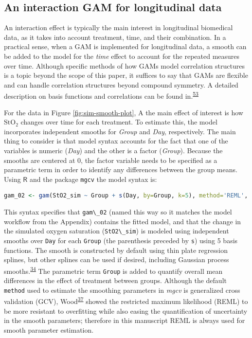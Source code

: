 \documentclass[
]{article}
\newcommand{\passthrough}[1]{#1}
\begin{document}
\hypertarget{an-interaction-gam-for-longitudinal-data}{%
\subsection{An interaction GAM for longitudinal data}\label{an-interaction-gam-for-longitudinal-data}}

An interaction effect is typically the main interest in longitudinal biomedical data, as it takes into account treatment, time, and their combination. In a practical sense, when a GAM is implemented for longitudinal data, a smooth can be added to the model for the \emph{time} effect to account for the repeated measures over time. Although specific methods of how GAMs model correlation structures is a topic beyond the scope of this paper, it suffices to say that GAMs are flexible and can handle correlation structures beyond compound symmetry. A detailed description on basis functions and correlations can be found in.\textsuperscript{\protect\hyperlink{ref-hefley2017}{53}}

For the data in Figure \ref{fig:sim-smooth-plot}, A the main effect of interest is how \(\mbox{StO}_2\) changes over time for each treatment. To estimate this, the model incorporates independent smooths for \emph{Group} and \emph{Day}, respectively. The main thing to consider is that model syntax accounts for the fact that one of the variables is numeric (\emph{Day}) and the other is a factor (\emph{Group}). Because the smooths are centered at 0, the factor variable needs to be specified as a parametric term in order to identify any differences between the group means. Using \(\textsf{R}\) and the package \passthrough{\lstinline!mgcv!} the model syntax is:

\begin{lstlisting}[language=R]
gam_02 <- gam(StO2_sim ~ Group + s(Day, by=Group, k=5), method='REML', data = dat_sim)
\end{lstlisting}

This syntax specifies that \passthrough{\lstinline!gam\_02!} (named this way so it matches the model workflow from the Appendix) contains the fitted model, and that the change in the simulated oxygen saturation (\passthrough{\lstinline!StO2\_sim!}) is modeled using independent smooths over \passthrough{\lstinline!Day!} for each \passthrough{\lstinline!Group!} (the parenthesis preceded by \passthrough{\lstinline!s!}) using 5 basis functions. The smooth is constructed by default using thin plate regression splines, but other splines can be used if desired, including Gaussian process smooths.\textsuperscript{\protect\hyperlink{ref-simpson2018}{34}} The parametric term \passthrough{\lstinline!Group!} is added to quantify overall mean differences in the effect of treatment between groups. Although the default \passthrough{\lstinline!method!} used to estimate the smoothing parameters in \emph{mgcv} is generalized cross validation (GCV), Wood\textsuperscript{\protect\hyperlink{ref-wood2017}{37}} showed the restricted maximum likelihood (REML) to be more resistant to overfitting while also easing the quantification of uncertainty in the smooth parameters; therefore in this manuscript REML is always used for smooth parameter estimation.
\end{document}
